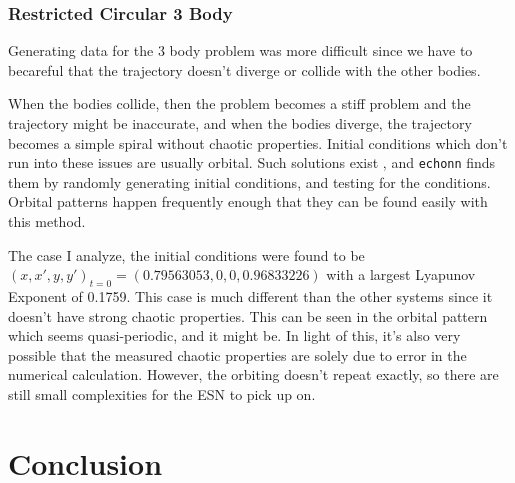 \documentclass{article}
\begin{document}
\subsubsection{Restricted Circular 3 Body}

Generating data for the 3 body problem was more difficult since we have to becareful that the trajectory doesn't diverge or collide with the other bodies. 

When the bodies collide, then the problem becomes a stiff problem and the
trajectory might be inaccurate, and when the bodies diverge, the trajectory
becomes a simple spiral without chaotic properties. Initial conditions which
don't run into these issues are usually orbital. Such solutions exist
\cite{frnkacase}, and \texttt{echonn} finds them by randomly generating initial
conditions, and testing for the conditions. Orbital patterns happen frequently
enough that they can be found easily with this method. 

The case I analyze, the initial conditions were found to be 
$(x, x', y, y')_{t=0} = (0.79563053, 0, 0, 0.96833226)$
with a largest Lyapunov Exponent of 0.1759. This case is much different than 
the other systems since it doesn't have strong chaotic properties. This can
be seen in the orbital pattern which seems quasi-periodic, and it might be. 
In light of this, it's also very possible that the measured chaotic properties
are solely due to error in the numerical calculation. However, the orbiting
doesn't repeat exactly, so there are still small complexities for the ESN
to pick up on. 
\section{Conclusion}



\end{document}
